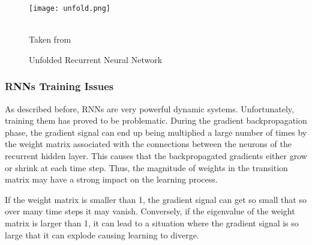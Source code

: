 \begin{figure}

\center
\texttt{[image: unfold.png]}
\caption{Unfolded Recurrent Neural Network}
\label{fig:unfold}
\begin{minipage}{12cm}
    \footnotesize
    \center
    \emph \\ Taken from \cite{lecun2015deep}
    \end{minipage}
\end{figure}



\subsubsection{RNNs Training Issues}
As described before, RNNs are very powerful dynamic systems. Unfortunately, training them has proved to be problematic. During the gradient backpropagation phase, the gradient signal can end up being multiplied a large number of times by the weight matrix associated with the connections between the neurons of the recurrent hidden layer. This causes that the backpropagated gradients either grow or shrink at each time step. Thus, the magnitude of weights in the transition matrix may have a strong impact on the learning process.

If the  weight matrix is smaller than 1, the gradient signal can get so small that so over many time steps it may vanish. Conversely, if the eigenvalue of the weight matrix is larger than 1, it can lead to a situation where the gradient signal is so large that it can explode causing learning to diverge. 


